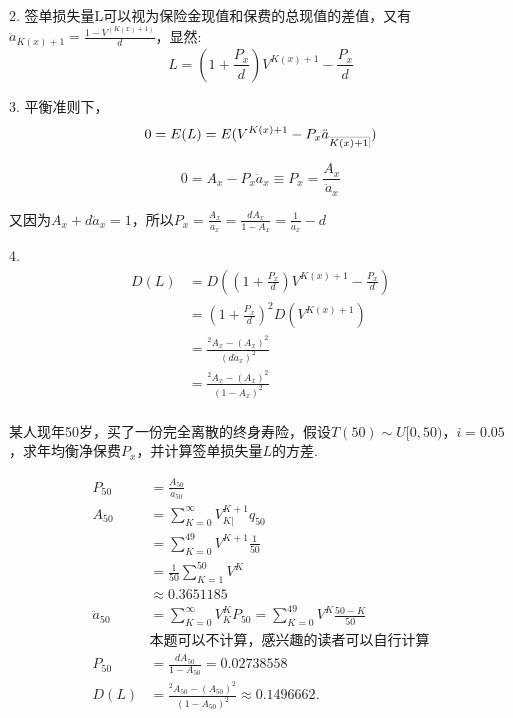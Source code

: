 \documentclass[a4paper,10pt]{ctexbook}
\makeatletter
\DeclareRobustCommand{\annu}[1]{_{%
    \def\arraystretch{0}%
    \setlength\arraycolsep{1pt}%
    \setlength\arrayrulewidth{.2pt}%
    \begin{array}[b]{@{}c|}\hline
        \\[\arraycolsep]%
        \scriptstyle #1%
    \end{array}%
}}
\makeatother
\begin{document}
2. 签单损失量L可以视为保险金现值和保费的总现值的差值，又有$\ddot{a}_{K(x)+1}=\frac{1-V^(K(x)+1)}{d}$，显然:
$$L = (1+\frac{P_{x}}{d})V^{K(x)+1}-\frac{P_{x}}{d}$$

3. 平衡准则下，$$0=E(L)=E(V^{K(x)+1}-P_{x}\ddot{a}_{\annu{K(x)+1}})$$

$$0=A_{x}-P_{x}\ddot{a}_{x} \equiv P_{x}=\frac{A_{x}}{\ddot{a}_{x}}$$

又因为$A_{x}+d\ddot{a}_{x}=1$，所以$P_{x}=\frac{A_{x}}{\ddot{a}_{x}}=\frac{dA_{x}}{1-A_{x}}=\frac{1}{\ddot{a}_{x}}-d$

4.
\begin{align*}
    D(L) & = D((1+\frac{P_{x}}{d})V^{K(x)+1}-\frac{P_{x}}{d})  \\
         & = (1+\frac{P_{x}}{d})^{2}D(V^{K(x)+1})              \\
         & = \frac{^{2}A_{x}-(A_{x})^{2}}{(d\ddot{a}_{x})^{2}} \\
         & = \frac{^{2}A_{x}-(A_{x})^{2}}{(1-A_{x})^{2}}       \\
\end{align*}

\begin{example}
    某人现年50岁，买了一份完全离散的终身寿险，假设$T(50)\sim U[0,50)$，$i=0.05$，求年均衡净保费$P_{x}$，并计算签单损失量$L$的方差.
\end{example}
\solution
\begin{align*}
    P_{50}        & =\frac{A_{50}}{\ddot{a}_{50}}                                           \\
    A_{50}        & =\sum^{\infty}_{K=0}V^{K+1}_{K|}q_{50}                                  \\
                  & =\sum^{49}_{K=0}V^{K+1}\frac{1}{50}                                     \\
                  & =\frac{1}{50}\sum^{50}_{K=1}V^{K}                                       \\
                  & \approx 0.3651185                                                       \\
    \ddot{a}_{50} & =\sum^{\infty}_{K=0}V^{K}_{K}P_{50}=\sum^{49}_{K=0}V^{K}\frac{50-K}{50} \\
                  & \text{本题可以不计算，感兴趣的读者可以自行计算}                                             \\
    P_{50}        & =\frac{dA_{50}}{1-A_{50}}=0.02738558                                    \\
    D(L)          & =\frac{^{2}A_{50}-(A_{50})^{2}}{(1-A_{50})^2}\approx 0.1496662.
\end{align*}
\end{document}
